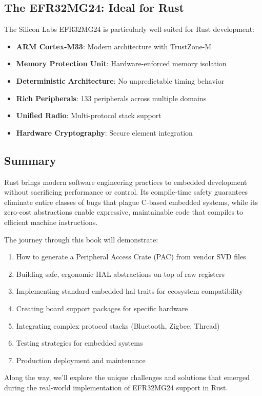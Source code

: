 \subsection{The EFR32MG24: Ideal for Rust}
\label{sec:efr32mg24-for-rust}

The Silicon Labs EFR32MG24 is particularly well-suited for Rust development:

\begin{itemize}
    \item \textbf{ARM Cortex-M33}: Modern architecture with TrustZone-M
    \item \textbf{Memory Protection Unit}: Hardware-enforced memory isolation
    \item \textbf{Deterministic Architecture}: No unpredictable timing behavior
    \item \textbf{Rich Peripherals}: 133 peripherals across multiple domains
    \item \textbf{Unified Radio}: Multi-protocol stack support
    \item \textbf{Hardware Cryptography}: Secure element integration
\end{itemize}

\subsection{Summary}
\label{sec:why-rust-summary}

Rust brings modern software engineering practices to embedded development without sacrificing performance or control. Its compile-time safety guarantees eliminate entire classes of bugs that plague C-based embedded systems, while its zero-cost abstractions enable expressive, maintainable code that compiles to efficient machine instructions.

The journey through this book will demonstrate:

\begin{enumerate}
    \item How to generate a Peripheral Access Crate (PAC) from vendor SVD files
    \item Building safe, ergonomic HAL abstractions on top of raw registers
    \item Implementing standard embedded-hal traits for ecosystem compatibility
    \item Creating board support packages for specific hardware
    \item Integrating complex protocol stacks (Bluetooth, Zigbee, Thread)
    \item Testing strategies for embedded systems
    \item Production deployment and maintenance
\end{enumerate}

Along the way, we'll explore the unique challenges and solutions that emerged during the real-world implementation of EFR32MG24 support in Rust.
\clearpage
